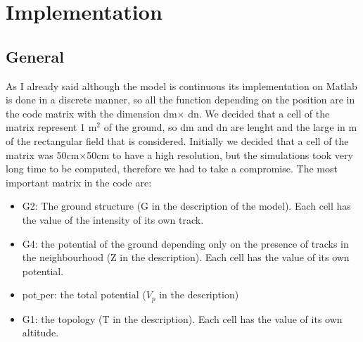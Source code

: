 \documentclass[11pt]{article}
\begin{document}
\section{Implementation}

\subsection{General}

As I already said although the model is continuous its implementation on Matlab is done in a discrete manner, so all the function depending on the position are in the code matrix with the dimension dm$\times$ dn. We decided that a cell of the matrix represent 1 m$^{2}$ of the ground, so dm and dn are lenght and the large in m of the rectangular field that is considered. Initially we decided that a cell of the matrix was 50cm$\times$50cm to have a high resolution, but the simulations took very long time to be computed, therefore we had to take a compromise. The most important matrix in the code are:
\begin{itemize}
\item G2: The ground structure (G in the description of the model). Each cell has the value of the intensity of its own track.
\item G4: the potential of the ground depending only on the presence of tracks in the neighbourhood (Z in the description). Each cell has the value of its own potential.
\item pot$\_$per: the total potential ($V_{p}$ in the description)
\item G1: the topology (T in the description). Each cell has the value of its own altitude.
\end{itemize} 
\end{document}
